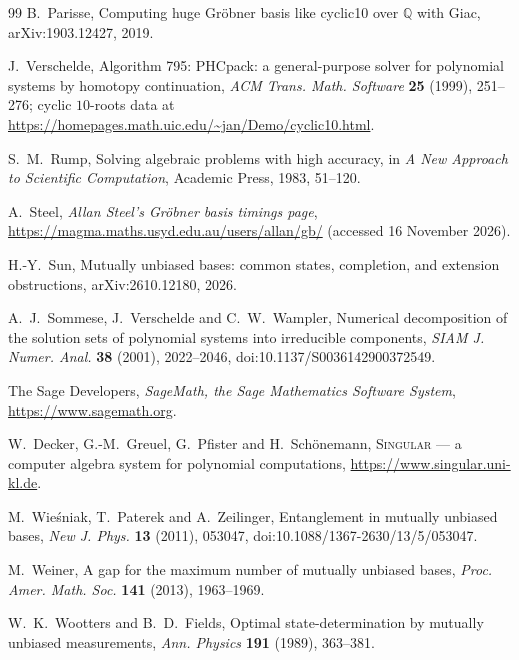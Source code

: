 \documentclass[11pt]{article}
\theoremstyle{definition}
\theoremstyle{remark}
\begin{document}
\begin{thebibliography}{99}
 B.~Parisse, Computing huge Gröbner basis like cyclic10 over $\mathbb Q$ with Giac,
  arXiv:1903.12427, 2019.

 J.~Verschelde, Algorithm 795: PHCpack: a general-purpose solver for polynomial systems by homotopy
  continuation, \emph{ACM Trans. Math. Software} \textbf{25} (1999), 251--276; cyclic $10$-roots data at
  \url{https://homepages.math.uic.edu/~jan/Demo/cyclic10.html}.

 S.~M.~Rump, Solving algebraic problems with high accuracy, in \emph{A New Approach to Scientific
  Computation}, Academic Press, 1983, 51--120.

 A.~Steel, \emph{Allan Steel's Gr\"obner basis timings page},
  \url{https://magma.maths.usyd.edu.au/users/allan/gb/} (accessed 16 November 2026).

 H.-Y.~Sun, Mutually unbiased bases: common states, completion, and extension obstructions,
  arXiv:2610.12180, 2026.

 A.~J.~Sommese, J.~Verschelde and C.~W.~Wampler, Numerical decomposition of the solution sets of
  polynomial systems into irreducible components, \emph{SIAM J. Numer. Anal.} \textbf{38} (2001), 2022--2046,
  doi:10.1137/S0036142900372549.

 The Sage Developers, \emph{SageMath, the Sage Mathematics Software System}, \url{https://www.sagemath.org}.

 W.~Decker, G.-M.~Greuel, G.~Pfister and H.~Schönemann, \textsc{Singular} --- a computer algebra
  system for polynomial computations, \url{https://www.singular.uni-kl.de}.

 M.~Wie\'sniak, T.~Paterek and A.~Zeilinger, Entanglement in mutually unbiased bases, \emph{New J.
  Phys.} \textbf{13} (2011), 053047, doi:10.1088/1367-2630/13/5/053047.

 M.~Weiner, A gap for the maximum number of mutually unbiased bases,
  \emph{Proc. Amer. Math. Soc.} \textbf{141} (2013), 1963--1969.

 W.~K.~Wootters and B.~D.~Fields, Optimal state-determination by mutually unbiased
  measurements, \emph{Ann. Physics} \textbf{191} (1989), 363--381.

\end{thebibliography}
\end{document}
